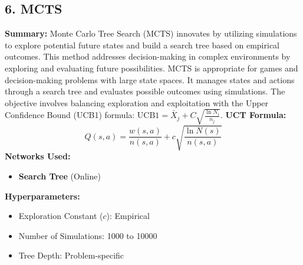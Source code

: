 \documentclass[a4paper,10pt]{article}
\begin{document}
\begin{multicols}{2}
\section*{6. MCTS}
\textbf{Summary:} Monte Carlo Tree Search (MCTS) innovates by utilizing simulations to explore potential future states and build a search tree based on empirical outcomes. This method addresses decision-making in complex environments by exploring and evaluating future possibilities. MCTS is appropriate for games and decision-making problems with large state spaces. It manages states and actions through a search tree and evaluates possible outcomes using simulations. The objective involves balancing exploration and exploitation with the Upper Confidence Bound (UCB1) formula: \( \text{UCB1} = \bar{X}_j + C \sqrt{\frac{\ln N_i}{n_j}} \).
\textbf{UCT Formula:}
\[
Q(s, a) = \frac{w(s, a)}{n(s, a)} + c \sqrt{\frac{\ln N(s)}{n(s, a)}}
\]
\textbf{Networks Used:}
\begin{itemize}
    \item \textbf{Search Tree} (Online)
\end{itemize}
\textbf{Hyperparameters:}
\begin{itemize}
    \item Exploration Constant (\(c\)): Empirical
    \item Number of Simulations: 1000 to 10000
    \item Tree Depth: Problem-specific
\end{itemize}


\end{multicols}
\end{document}
